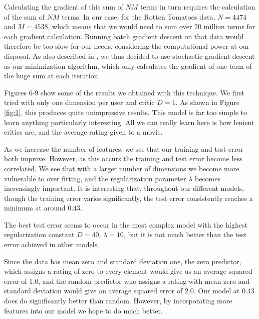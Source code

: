 \documentclass[12pt]{article}
\begin{document}
Calculating the gradient of this sum of $NM$ terms in turn requires the calculation of the sum of $NM$ terms. In our case, for the Rotten Tomatoes data, $N = 4474$ and $M = 4538$, which means that we would need to sum over 20 million terms for each gradient calculation. Running batch gradient descent on that data would therefore be too slow for our needs, considering the computational power at our disposal. As also described in \cite{Koren09}, we thus decided to use stochastic gradient descent as our minimization algorithm, which only calculates the gradient of one term of the huge sum at each iteration.

Figures 6-9 show some of the results we obtained with this technique. We first tried with only one dimension per user and critic $D=1$. As shown in Figure \ref{fig:1}, this produces quite unimpressive results. This model is far too simple to learn anything particularly interesting. All we can really learn here is how lenient critics are, and the average rating given to a movie.

As we increase the number of features, we see that our training and test error both improve. However, as this occurs the training and test error become less correlated. We see that with a larger number of dimensions we become more vulnerable to over fitting, and the regularization parameter $\lambda$ becomes increasingly important. It is interesting that, throughout our different models, though the training error varies significantly, the test error consistently reaches a minimum at around $0.43$. 

The best test error seems to occur in the most complex model with the highest regularization constant $D=40$, $\lambda = 10$, but it is not much better than the test error achieved in other models.

Since the data has mean zero and standard deviation one, the zero predictor, which assigns a rating of zero to every element would give us an average squared error of $1.0$, and the random predictor who assigns a rating with mean zero and standard deviation would give an average squared error of $2.0$. Our model at $0.43$ does do significantly better than random. However, by incorporating more features into our model we hope to do much better.
\end{document}
